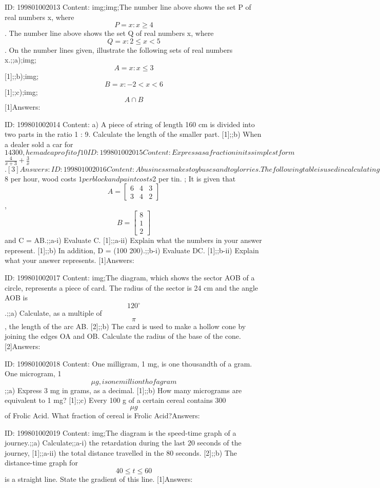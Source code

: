 \documentclass{article}
\begin{document}
ID: 199801002013
Content:
img;img;The number line above shows the set P of real numbers x, where $$P={x:x \geq 4}$$. The number line above shows the set Q of real numbers x, where $$Q={x:2\leq x<5}$$. On the number lines given, illustrate the following sets of real numbers x.;;a);img;$$A={x:x\leq3}$$ [1];;b);img;$$B={x:-2<x<6}$$ [1];;c);img;$$A \cap B$$ [1]Answers:

ID: 199801002014
Content:
a) A piece of string of length 160 cm is divided into two parts in the ratio 1 : 9. Calculate the length of the smaller part. [1];;b) When a dealer sold a car for $14300, he made a profit of 10%

ID: 199801002015
Content:
Express as a fraction in its simplest form $$\frac{4}{x+3}+\frac{3}{x}$$. [3]Answers:

ID: 199801002016
Content:
A business makes toy buses and toy lorries. The following table is used in calculating the cost of manufacturing each toy.;img; Labour costs $8 per hour, wood costs $1 per block and paint costs $2 per tin. ; It is given that $$A=\begin{bmatrix}6&4&3\\3&4&2\end{bmatrix}$$, $$B=\begin{bmatrix}8\\1\\2\end{bmatrix}$$ and C = AB.;;a-i) Evaluate C. [1];;a-ii) Explain what the numbers in your answer represent. [1];;b) In addition, D = (100 200).;;b-i) Evaluate DC. [1];;b-ii) Explain what your answer represents. [1]Answers:

ID: 199801002017
Content:
img;The diagram, which shows the sector AOB of a circle, represents a piece of card. The radius of the sector is 24 cm and the angle AOB is $$120^{\circ}$$.;;a) Calculate, as a multiple of $$\pi$$, the length of the arc AB. [2];;b) The card is used to make a hollow cone by joining the edges OA and OB. Calculate the radius of the base of the cone. [2]Answers:

ID: 199801002018
Content:
One milligram, 1 mg, is one thousandth of a gram. One microgram, 1 $$\mu g, is one millionth of a gram$$;;a) Express 3 mg in grams, as a decimal. [1];;b) How many micrograms are equivalent to 1 mg? [1];;c) Every 100 g of a certain cereal contains 300 $$\mu g$$ of Frolic Acid. What fraction of cereal is Frolic Acid?Answers:

ID: 199801002019
Content:
img;The diagram is the speed-time graph of a journey.;;a) Calculate;;a-i) the retardation during the last 20 seconds of the journey, [1];;a-ii) the total distance travelled in the 80 seconds. [2];;b) The distance-time graph for $$40\leq t\leq 60$$ is a straight line. State the gradient of this line. [1]Answers:
\end{document}
